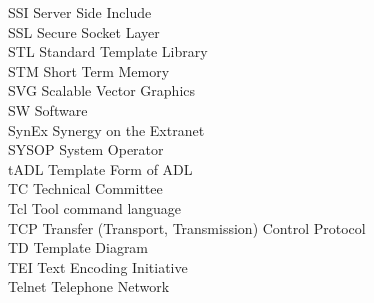 \begin{tabbing}

    \>SSI \>\>Server Side Include\\

    \>SSL \>\>Secure Socket Layer\\

    \>STL \>\>Standard Template Library\\

    \>STM \>\>Short Term Memory\\

    \>SVG \>\>Scalable Vector Graphics\\

    \>SW \>\>Software\\




    \>SynEx \>\>Synergy on the Extranet\\

    \>SYSOP \>\>System Operator\\

    \>tADL \>\>Template Form of ADL\\

    \>TC \>\>Technical Committee\\



    \>Tcl \>\>Tool command language\\


    \>TCP \>\>Transfer (Transport, Transmission) Control Protocol\\

    \>TD \>\>Template Diagram\\

    \>TEI \>\>Text Encoding Initiative\\

    \>Telnet \>\>Telephone Network\\


\end{tabbing}
